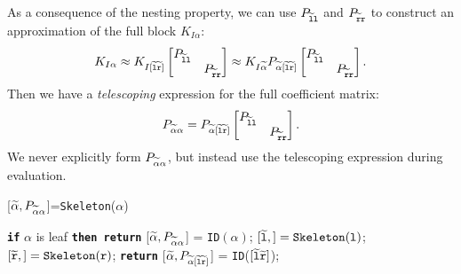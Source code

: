 As a consequence of the nesting property,
we can use $P_{{\widetilde{{\tt l}}}{\tt l}}$ and $P_{{\widetilde{{\tt r}}}{\tt r}}$ to construct an approximation of
the full block $K_{I\alpha}$:
\begin{equation}
K_{I\alpha}
\approx
K_{I[{\widetilde{{\tt l}}}{\widetilde{{\tt r}}}]}
\begin{bmatrix}
  P_{{\widetilde{{\tt l}}}{\tt l}} & \\
                  & P_{{\widetilde{{\tt r}}}{\tt r}} \\
\end{bmatrix}
\approx
K_{I{\widetilde{\alpha}}} P_{{\widetilde{\alpha}}[{\widetilde{{\tt l}}}{\widetilde{{\tt r}}}]}
\begin{bmatrix}
  P_{{\widetilde{{\tt l}}}{\tt l}} & \\
                  & P_{{\widetilde{{\tt r}}}{\tt r}} \\
\end{bmatrix}.
\end{equation}
Then we have a \emph{telescoping} expression for the full coefficient matrix:
\begin{equation}
P_{{\widetilde{\alpha}}\alpha} =
P_{{\widetilde{\alpha}}[{\widetilde{{\tt l}}}{\widetilde{{\tt r}}}]}
\begin{bmatrix}
  P_{{\widetilde{{\tt l}}}{\tt l}} & \\
                  & P_{{\widetilde{{\tt r}}}{\tt r}} \\
\end{bmatrix}.
\label{e:telescope}
\end{equation}
We never explicitly form $P_{{\widetilde{\alpha}}\alpha}$, but instead use the
telescoping expression during evaluation.

\begin{algorithm}[!t]
\caption{{} [${\widetilde{\alpha}}, P_{{\widetilde{\alpha}} \alpha}$]=\texttt{Skeleton}($\alpha$)}
\begin{algorithmic}
  \STATE \texttt{\bf if} $\alpha$ is leaf \texttt{\bf then return} [${\widetilde{\alpha}}, P_{{\widetilde{\alpha}} \alpha}$] = {\tt ID}$(\alpha)$;
  \STATE $[{\widetilde{{\tt l}}},]=\texttt{Skeleton}({\tt l})$; $[{\widetilde{{\tt r}}},]=\texttt{Skeleton}({\tt r})$;
  \STATE \texttt{\bf return} [${\widetilde{\alpha}}, P_{{\widetilde{\alpha}} [{\widetilde{{\tt l}}} {\widetilde{{\tt r}}}]
  }$] = {\tt ID}($[{\widetilde{{\tt l}}} {\widetilde{{\tt r}}}]$);
\end{algorithmic}
\label{a:skeletonize}
\end{algorithm}

